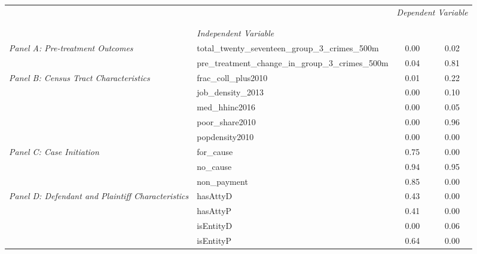 \begin{tabular}{llcc}
\toprule
 &  & \multicolumn{2}{c}{\textit{Dependent Variable}} \\
\cline{3-4}
\\
 &  &  &  \\
 & \emph{Independent Variable} &  &  \\
\midrule
\multirow[c]{2}{3cm}{\textit{Panel A: Pre-treatment Outcomes}} & total_twenty_seventeen_group_3_crimes_500m & 0.00 & 0.02 \\
 & pre_treatment_change_in_group_3_crimes_500m & 0.04 & 0.81 \\
\cline{1-4}
\multirow[c]{5}{3cm}{\textit{Panel B: Census Tract Characteristics}} & frac_coll_plus2010 & 0.01 & 0.22 \\
 & job_density_2013 & 0.00 & 0.10 \\
 & med_hhinc2016 & 0.00 & 0.05 \\
 & poor_share2010 & 0.00 & 0.96 \\
 & popdensity2010 & 0.00 & 0.00 \\
\cline{1-4}
\multirow[c]{3}{3cm}{\textit{Panel C: Case Initiation}} & for_cause & 0.75 & 0.00 \\
 & no_cause & 0.94 & 0.95 \\
 & non_payment & 0.85 & 0.00 \\
\cline{1-4}
\multirow[c]{4}{3cm}{\textit{Panel D: Defendant and Plaintiff Characteristics}} & hasAttyD & 0.43 & 0.00 \\
 & hasAttyP & 0.41 & 0.00 \\
 & isEntityD & 0.00 & 0.06 \\
 & isEntityP & 0.64 & 0.00 \\
\cline{1-4}
\bottomrule
\end{tabular}
